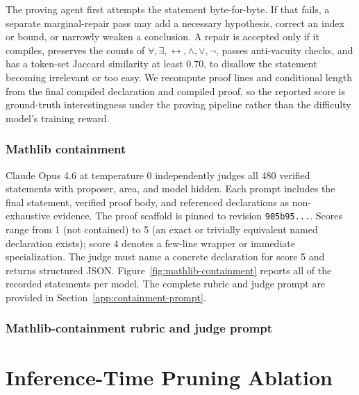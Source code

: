 The proving agent first attempts the statement byte-for-byte. If that fails, a separate
marginal-repair pass may add a necessary hypothesis, correct an index or bound,
or narrowly weaken a conclusion. A repair is accepted only if it compiles,
preserves the counts of $\forall,\exists,\leftrightarrow,\land,\lor,\neg$, passes
anti-vacuity checks, and has a token-set Jaccard similarity at least $0.70$, to disallow the statement becoming irrelevant or too easy.
We recompute proof lines and conditional length from the final compiled declaration and compiled proof, so the reported score is ground-truth interestingness under the proving pipeline rather
than the difficulty model's training reward.

\subsubsection{Mathlib containment}
\label{app:containment}

Claude Opus 4.6 at temperature 0
independently judges all 480 verified statements with proposer, area, and model
hidden. Each prompt includes the final statement, verified proof body, and
referenced \Mathlib declarations as non-exhaustive evidence. The proof scaffold
is pinned to \Mathlib revision
\texttt{905b95...}. Scores range from 1 (not contained) to 5 (an exact or trivially equivalent named
declaration exists); score 4 denotes a few-line wrapper or immediate
specialization. The judge must name a concrete declaration for score 5 and
returns structured JSON. Figure~\ref{fig:mathlib-containment} reports all of the recorded
statements per model.  The complete rubric and judge prompt are provided in
Section~\ref{app:containment-prompt}.

\subsubsection{Mathlib-containment rubric and judge prompt}



\newcommand{\genexheading}{\subsection}



\section{Inference-Time Pruning Ablation}
\label{app:inference-pruning}


